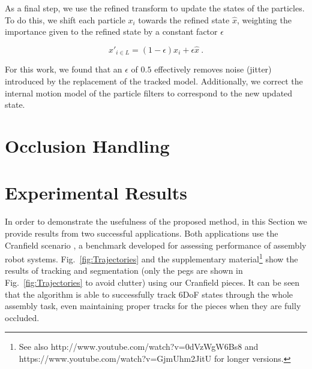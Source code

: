 As a final step, we use the refined transform to update the states of the particles. To do this, we shift each particle $x_i$ towards the refined state $\hat{x}$, weighting the importance given to the refined state by a constant factor $\epsilon$

\begin{equation}
\label{eqn:PFUpdate}
x'_{i \in L} = (1-\epsilon) x_i + \epsilon \hat{x}~.
\end{equation}

For this work, we found that an $\epsilon$ of $0.5$ effectively removes noise (jitter) introduced by the replacement of the tracked model. Additionally, we correct the internal motion model of the particle filters to correspond to the new updated state.

\section{Occlusion Handling}
\section{Experimental Results}
In order to demonstrate the usefulness of the proposed method, in this Section we provide results from two successful applications. Both applications use the Cranfield scenario \cite{collins1984development}, a benchmark developed for assessing performance of assembly robot systems. Fig.~\ref{fig:Trajectories} and the supplementary material\footnote{See also http://www.youtube.com/watch?v=0dVzWgW6Bs8 and https://www.youtube.com/watch?v=GjmUhm2JitU for longer versions.} show the results of tracking and segmentation (only the pegs are shown in Fig.~\ref{fig:Trajectories} to avoid clutter) using our Cranfield pieces. It can be seen that the algorithm is able to successfully track 6DoF states through the whole assembly task, even maintaining proper tracks for the pieces when they are fully occluded.

